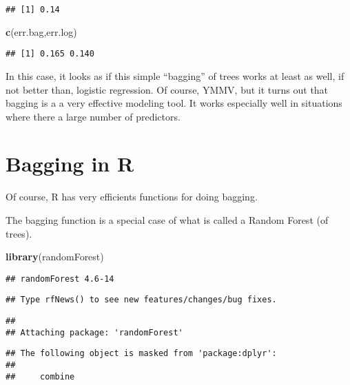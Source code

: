 \documentclass[]{article}
\newenvironment{Shaded}{\begin{snugshade}}{\end{snugshade}}
\newcommand{\KeywordTok}[1]{\textcolor[rgb]{0.13,0.29,0.53}{\textbf{#1}}}
\newcommand{\NormalTok}[1]{#1}
\begin{document}
\begin{verbatim}
## [1] 0.14
\end{verbatim}

\begin{Shaded}
\begin{Highlighting}[]
\KeywordTok{c}\NormalTok{(err.bag,err.log)}
\end{Highlighting}
\end{Shaded}

\begin{verbatim}
## [1] 0.165 0.140
\end{verbatim}

In this case, it looks as if this simple ``bagging'' of trees works at
least as well, if not better than, logistic regression. Of course, YMMV,
but it turns out that bagging is a a very effective modeling tool. It
works especially well in situations where there a large number of
predictors.

\hypertarget{bagging-in-r}{%
\section{Bagging in R}\label{bagging-in-r}}

Of course, R has very efficients functions for doing bagging.

The bagging function is a special case of what is called a Random Forest
(of trees).

\begin{Shaded}
\begin{Highlighting}[]
\KeywordTok{library}\NormalTok{(randomForest)}
\end{Highlighting}
\end{Shaded}

\begin{verbatim}
## randomForest 4.6-14
\end{verbatim}

\begin{verbatim}
## Type rfNews() to see new features/changes/bug fixes.
\end{verbatim}

\begin{verbatim}
## 
## Attaching package: 'randomForest'
\end{verbatim}

\begin{verbatim}
## The following object is masked from 'package:dplyr':
## 
##     combine
\end{verbatim}
\end{document}
